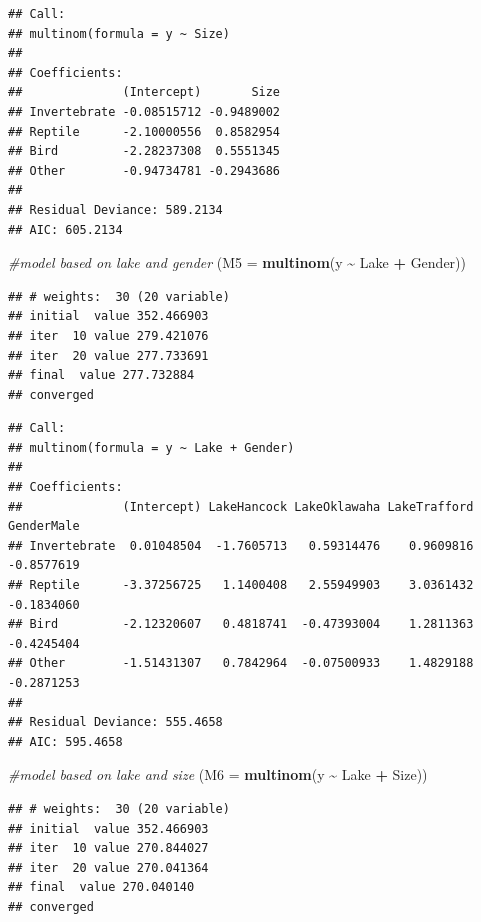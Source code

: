 \documentclass[
]{article}
\newenvironment{Shaded}{\begin{snugshade}}{\end{snugshade}}
\newcommand{\AttributeTok}[1]{\textcolor[rgb]{0.13,0.29,0.53}{#1}}
\newcommand{\CommentTok}[1]{\textcolor[rgb]{0.56,0.35,0.01}{\textit{#1}}}
\newcommand{\FunctionTok}[1]{\textcolor[rgb]{0.13,0.29,0.53}{\textbf{#1}}}
\newcommand{\NormalTok}[1]{#1}
\newcommand{\SpecialCharTok}[1]{\textcolor[rgb]{0.81,0.36,0.00}{\textbf{#1}}}
\begin{document}
\begin{verbatim}
## Call:
## multinom(formula = y ~ Size)
## 
## Coefficients:
##              (Intercept)       Size
## Invertebrate -0.08515712 -0.9489002
## Reptile      -2.10000556  0.8582954
## Bird         -2.28237308  0.5551345
## Other        -0.94734781 -0.2943686
## 
## Residual Deviance: 589.2134 
## AIC: 605.2134
\end{verbatim}

\begin{Shaded}
\begin{Highlighting}[]
\CommentTok{\#model based on lake and gender}
\NormalTok{(}\AttributeTok{M5 =} \FunctionTok{multinom}\NormalTok{(y }\SpecialCharTok{\textasciitilde{}}\NormalTok{ Lake }\SpecialCharTok{+}\NormalTok{ Gender))}
\end{Highlighting}
\end{Shaded}

\begin{verbatim}
## # weights:  30 (20 variable)
## initial  value 352.466903 
## iter  10 value 279.421076
## iter  20 value 277.733691
## final  value 277.732884 
## converged
\end{verbatim}

\begin{verbatim}
## Call:
## multinom(formula = y ~ Lake + Gender)
## 
## Coefficients:
##              (Intercept) LakeHancock LakeOklawaha LakeTrafford GenderMale
## Invertebrate  0.01048504  -1.7605713   0.59314476    0.9609816 -0.8577619
## Reptile      -3.37256725   1.1400408   2.55949903    3.0361432 -0.1834060
## Bird         -2.12320607   0.4818741  -0.47393004    1.2811363 -0.4245404
## Other        -1.51431307   0.7842964  -0.07500933    1.4829188 -0.2871253
## 
## Residual Deviance: 555.4658 
## AIC: 595.4658
\end{verbatim}

\begin{Shaded}
\begin{Highlighting}[]
\CommentTok{\#model based on lake and size}
\NormalTok{(}\AttributeTok{M6 =} \FunctionTok{multinom}\NormalTok{(y }\SpecialCharTok{\textasciitilde{}}\NormalTok{ Lake }\SpecialCharTok{+}\NormalTok{ Size))}
\end{Highlighting}
\end{Shaded}

\begin{verbatim}
## # weights:  30 (20 variable)
## initial  value 352.466903 
## iter  10 value 270.844027
## iter  20 value 270.041364
## final  value 270.040140 
## converged
\end{verbatim}
\end{document}
